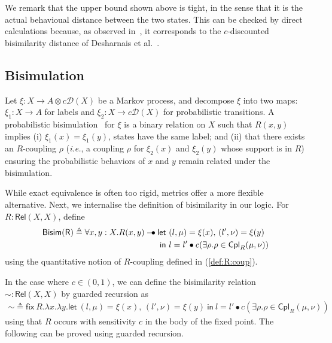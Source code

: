\documentclass[a4paper,UKenglish,cleveref, autoref, thm-restate]{lipics-v2021}
\newcommand{\ie}{\textit{i.e.}}
\newcommand{\mprod}{\otimes}
\newcommand{\D}{\mathcal{D}}
\newcommand{\semLabels}{A}
\newcommand{\letIn}[2]{\mathsf{let~} #1 \mathsf{~in~} #2}
\newcommand{\fix}[2]{\mathsf{fix~} #1 . #2 }
\newcommand{\Prop}{\mathsf{Prop}}
\newcommand{\ltensor}{*}
\renewcommand{\ltensor}{\bullet}
\newcommand{\lexp}{\mathbin{{-}\kern-.2em\raisebox{0ex}{$*$}}}
\renewcommand{\lexp}{\mathbin{{-}\kern-.2em\raisebox{0ex}{$\bullet$}}}
\newcommand{\coup}[4]{#2 \in \mathsf{Cpl}_{#1}(#3,#4)}
\newcommand{\Rel}[2]{\mathsf{Rel}(#1,#2)}
\newcommand{\Bisim}[1]{\mathsf{Bisim(#1)}} %
\newcommand{\bisim}{\sim} %
\newcommand{\discfact}{c} %
\newcommand{\peq}{=}
\newcommand{\defeq}{\triangleq}
\begin{document}
We remark that the upper bound shown above is tight, in the sense
that it is the actual behavioual distance between
the two states. This can be checked by direct calculations because, as observed in~\cite{BreugelW05}, it corresponds to the $\discfact$-discounted bisimilarity distance of Desharnais et al.~\cite{Desharnais00}.

\subsection{Bisimulation}

Let $\xi \colon X \to \semLabels \mprod \discfact \D(X)$ be a Markov process, and decompose $\xi$ into two maps: $\xi_1 \colon X \to \semLabels$ for labels and $\xi_2 \colon X \to \discfact \D(X)$ for probabilistic transitions. 
A probabilistic bisimulation~\cite{LarsenS91} for $\xi$ is a binary relation on $X$ such that
$R(x,y)$ implies (i) $\xi_1(x) = \xi_1(y)$, states have the same label; and (ii) that there exists an $R$-coupling $\rho$ (\ie, a
coupling $\rho$ for $\xi_2(x)$ and $\xi_2(y)$ whose support is in $R$) ensuring the probabilistic behaviors of $x$ and $y$ remain related under the bisimulation.

While exact equivalence is often too rigid, metrics offer a more flexible alternative. Next, we internalise the 
definition of bisimilarity in our logic. 
For $R : \Rel XX$, define %
\begin{align*}
 \Bisim{R} \defeq \forall x,y : X. R(x,y) \lexp 
    \letIn{&(l, \mu) = \xi(x), \,
    (l', \nu) = \xi(y)\\}{&
   l \peq l' \ltensor \discfact( \exists \rho . \coup{R}\rho\mu\nu}) 
\end{align*}
using the quantitative notion of $R$-coupling defined in (\ref{def:R:coup}). 

In the case where $\discfact \in (0,1)$, we can define the bisimilarity relation ${\bisim} : \Rel XX$ by guarded recursion as 
\begin{align*}
 {\bisim} \defeq \fix R \lambda x. \lambda y.  
 \letIn{(l, \mu) = \xi(x), \,
    (l', \nu) = \xi(y)}{
   l \peq l' \ltensor \discfact( \exists \rho . \coup{R}\rho\mu\nu})
\end{align*}
using that $R$ occurs with sensitivity $\discfact$ in the body of the fixed point. 
The following can be proved using guarded recursion. 
\end{document}
